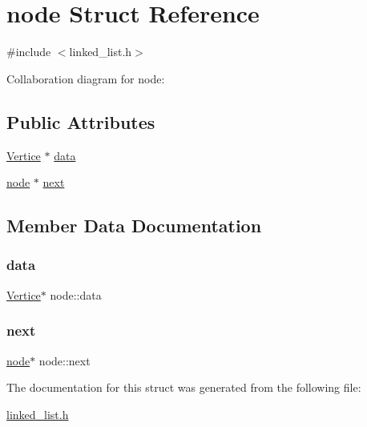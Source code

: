 \hypertarget{structnode}{}\section{node Struct Reference}
\label{structnode}


{\ttfamily \#include $<$linked\+\_\+list.\+h$>$}



Collaboration diagram for node\+:
\subsection*{Public Attributes}
\begin{DoxyCompactItemize}
\item 
\hyperlink{structVertice}{Vertice} $\ast$ \hyperlink{structnode_a51e5282e90f3acf5c081fd447db4b525}{data}
\item 
\hyperlink{structnode}{node} $\ast$ \hyperlink{structnode_aad210fa7c160a49f6b9a3ffee592a2bc}{next}
\end{DoxyCompactItemize}


\subsection{Member Data Documentation}
\mbox{\label{structnode_a51e5282e90f3acf5c081fd447db4b525}} 
\subsubsection{\texorpdfstring{data}{data}}
{\footnotesize\ttfamily \hyperlink{structVertice}{Vertice}$\ast$ node\+::data}

\mbox{\label{structnode_aad210fa7c160a49f6b9a3ffee592a2bc}} 
\subsubsection{\texorpdfstring{next}{next}}
{\footnotesize\ttfamily \hyperlink{structnode}{node}$\ast$ node\+::next}



The documentation for this struct was generated from the following file\+:\begin{DoxyCompactItemize}
\item 
\hyperlink{linked__list_8h}{linked\+\_\+list.\+h}\end{DoxyCompactItemize}
